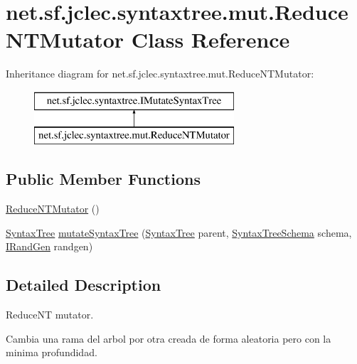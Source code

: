 \hypertarget{classnet_1_1sf_1_1jclec_1_1syntaxtree_1_1mut_1_1_reduce_n_t_mutator}{\section{net.\-sf.\-jclec.\-syntaxtree.\-mut.\-Reduce\-N\-T\-Mutator Class Reference}
\label{classnet_1_1sf_1_1jclec_1_1syntaxtree_1_1mut_1_1_reduce_n_t_mutator}
}
Inheritance diagram for net.\-sf.\-jclec.\-syntaxtree.\-mut.\-Reduce\-N\-T\-Mutator\-:\begin{figure}[H]
\begin{center}
\leavevmode
\includegraphics[height=2.000000cm]{classnet_1_1sf_1_1jclec_1_1syntaxtree_1_1mut_1_1_reduce_n_t_mutator}
\end{center}
\end{figure}
\subsection*{Public Member Functions}
\begin{DoxyCompactItemize}
\item 
\hyperlink{classnet_1_1sf_1_1jclec_1_1syntaxtree_1_1mut_1_1_reduce_n_t_mutator_a9f24837d8c4cc00a1e00250cf9ddd229}{Reduce\-N\-T\-Mutator} ()
\item 
\hyperlink{classnet_1_1sf_1_1jclec_1_1syntaxtree_1_1_syntax_tree}{Syntax\-Tree} \hyperlink{classnet_1_1sf_1_1jclec_1_1syntaxtree_1_1mut_1_1_reduce_n_t_mutator_a5b964bee3225e8ef0a25288618cb6a6b}{mutate\-Syntax\-Tree} (\hyperlink{classnet_1_1sf_1_1jclec_1_1syntaxtree_1_1_syntax_tree}{Syntax\-Tree} parent, \hyperlink{classnet_1_1sf_1_1jclec_1_1syntaxtree_1_1_syntax_tree_schema}{Syntax\-Tree\-Schema} schema, \hyperlink{interfacenet_1_1sf_1_1jclec_1_1util_1_1random_1_1_i_rand_gen}{I\-Rand\-Gen} randgen)
\end{DoxyCompactItemize}


\subsection{Detailed Description}
Reduce\-N\-T mutator.

Cambia una rama del arbol por otra creada de forma aleatoria pero con la minima profundidad.

